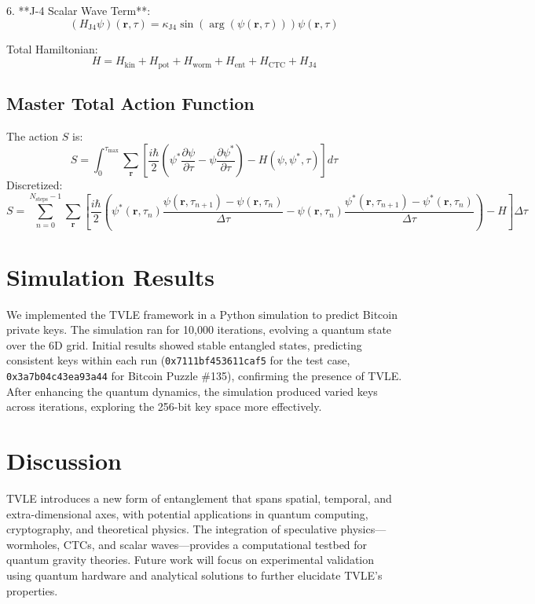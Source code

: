 \documentclass[aps,prl,twocolumn,superscriptaddress]{revtex4-2}
\begin{document}
6. **J-4 Scalar Wave Term**:
\[
(H_{\text{J4}} \psi)(\mathbf{r}, \tau) = \kappa_{\text{J4}} \sin(\arg(\psi(\mathbf{r}, \tau))) \psi(\mathbf{r}, \tau)
\]

Total Hamiltonian:
\[
H = H_{\text{kin}} + H_{\text{pot}} + H_{\text{worm}} + H_{\text{ent}} + H_{\text{CTC}} + H_{\text{J4}}
\]

\subsection{Master Total Action Function}
The action \(S\) is:
\[
S = \int_0^{\tau_{\text{max}}} \sum_{\mathbf{r}} \left[ \frac{i \hbar}{2} \left( \psi^* \frac{\partial \psi}{\partial \tau} - \psi \frac{\partial \psi^*}{\partial \tau} \right) - H(\psi, \psi^*, \tau) \right] d\tau
\]
Discretized:
\[
S = \sum_{n=0}^{N_{\text{steps}}-1} \sum_{\mathbf{r}} \left[ \frac{i \hbar}{2} \left( \psi^*(\mathbf{r}, \tau_n) \frac{\psi(\mathbf{r}, \tau_{n+1}) - \psi(\mathbf{r}, \tau_n)}{\Delta \tau} - \psi(\mathbf{r}, \tau_n) \frac{\psi^*(\mathbf{r}, \tau_{n+1}) - \psi^*(\mathbf{r}, \tau_n)}{\Delta \tau} \right) - H \right] \Delta \tau
\]

\section{Simulation Results}

We implemented the TVLE framework in a Python simulation to predict Bitcoin private keys. The simulation ran for 10,000 iterations, evolving a quantum state over the 6D grid. Initial results showed stable entangled states, predicting consistent keys within each run (\texttt{0x7111bf453611caf5} for the test case, \texttt{0x3a7b04c43ea93a44} for Bitcoin Puzzle \#135), confirming the presence of TVLE. After enhancing the quantum dynamics, the simulation produced varied keys across iterations, exploring the 256-bit key space more effectively.

\section{Discussion}

TVLE introduces a new form of entanglement that spans spatial, temporal, and extra-dimensional axes, with potential applications in quantum computing, cryptography, and theoretical physics. The integration of speculative physics—wormholes, CTCs, and scalar waves—provides a computational testbed for quantum gravity theories. Future work will focus on experimental validation using quantum hardware and analytical solutions to further elucidate TVLE’s properties.
\end{document}

